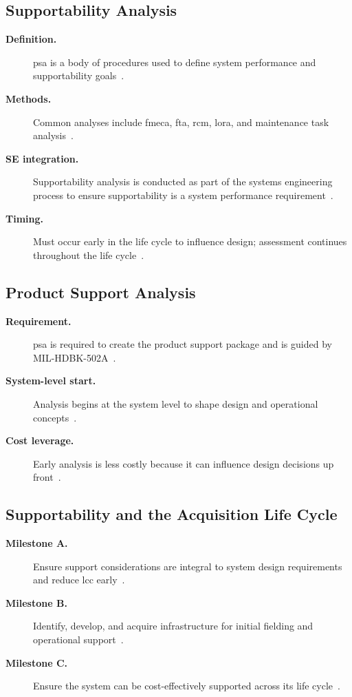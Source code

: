 \documentclass[../main.tex]{subfiles}
\begin{document}
\subsection{Supportability Analysis}
\begin{description}
  \item[\textbf{Definition.}] \ac{psa} is a body of procedures used to define system performance and supportability goals~\autocite{edo-3-5-4-acquisition-logistics-2025}.
  \item[\textbf{Methods.}] Common analyses include \ac{fmeca}, \ac{fta}, \ac{rcm}, \ac{lora}, and maintenance task analysis~\autocite{edo-3-5-4-acquisition-logistics-2025}.
  \item[\textbf{SE integration.}] Supportability analysis is conducted as part of the systems engineering process to ensure supportability is a system performance requirement~\autocite{edo-3-5-4-acquisition-logistics-2025}.
  \item[\textbf{Timing.}] Must occur early in the life cycle to influence design; assessment continues throughout the life cycle~\autocite{edo-3-5-4-acquisition-logistics-2025}.
\end{description}

\subsection{Product Support Analysis}
\begin{description}
  \item[\textbf{Requirement.}] \ac{psa} is required to create the product support package and is guided by MIL-HDBK-502A~\autocite{edo-3-5-4-acquisition-logistics-2025}.
  \item[\textbf{System-level start.}] Analysis begins at the system level to shape design and operational concepts~\autocite{edo-3-5-4-acquisition-logistics-2025}.
  \item[\textbf{Cost leverage.}] Early analysis is less costly because it can influence design decisions up front~\autocite{edo-3-5-4-acquisition-logistics-2025}.
\end{description}

\subsection{Supportability and the Acquisition Life Cycle}
\begin{description}
  \item[\textbf{Milestone A.}] Ensure support considerations are integral to system design requirements and reduce \ac{lcc} early~\autocite{edo-3-5-4-acquisition-logistics-2025}.
  \item[\textbf{Milestone B.}] Identify, develop, and acquire infrastructure for initial fielding and operational support~\autocite{edo-3-5-4-acquisition-logistics-2025}.
  \item[\textbf{Milestone C.}] Ensure the system can be cost-effectively supported across its life cycle~\autocite{edo-3-5-4-acquisition-logistics-2025}.
\end{description}
\end{document}
